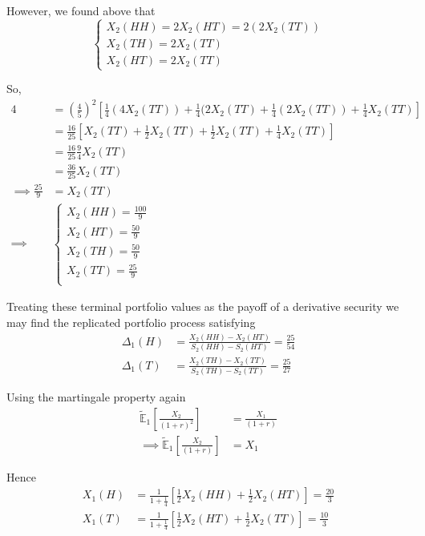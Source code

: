 \documentclass[12pt]{article}
\newlength\tindent
\renewcommand{\indent}{\hspace*{\tindent}}
\newcommand{\E}{\mathbb E}
\begin{document}
However, we found above that
\begin{equation*}
	\begin{cases}
		X_2(HH) = 2X_2(HT) = 2(2X_2(TT)) \\
		X_2(TH) = 2X_2(TT) \\
		X_2(HT) = 2X_2(TT)
	\end{cases}
\end{equation*}

So,
\begin{align*}
	4 &= \left( \frac{4}{5} \right)^2 \left[ \frac{1}{4}(4X_2(TT)) + \frac{1}{4}(2X_2(TT) + \frac{1}{4}(2X_2(TT)) + \frac{1}{4}X_2(TT) \right] \\
	&= \frac{16}{25} \left[ X_2(TT) + \frac{1}{2}X_2(TT) + \frac{1}{2}X_2(TT) + \frac{1}{4}X_2(TT) \right] \\
	&= \frac{16}{25}\frac{9}{4}X_2(TT) \\
	&= \frac{36}{25}X_2(TT) \\
	\implies \frac{25}{9} &= X_2(TT) \\
	\implies
	&\begin{cases}
		X_2(HH) = \frac{100}{9} \\
		X_2(HT) = \frac{50}{9} \\
		X_2(TH) = \frac{50}{9} \\
		X_2(TT) = \frac{25}{9} \\
	\end{cases}
\end{align*}

\indent Treating these terminal portfolio values as the payoff of a derivative security we may find the replicated portfolio process satisfying
\begin{align*}
	\Delta_1(H) &= \frac{ X_2(HH) - X_2(HT) }{ S_2(HH) - S_2(HT) } = \frac{25}{54} \\
	\Delta_1(T) &= \frac{ X_2(TH) - X_2(TT) }{ S_2(TH) - S_2(TT) } = \frac{25}{27} 
\end{align*}

Using the martingale property again 
\begin{align*}
	\tilde{\E}_1 \left[ \frac{X_2}{(1 + r)^2} \right] &= \frac{X_1}{(1 + r)} \\
	\implies \tilde{\E}_1 \left[ \frac{X_2}{(1 + r)} \right] &= X_1
\end{align*}

Hence
\begin{align*}
	X_1(H) &= \frac{1}{1 + \frac{1}{4}} \left[ \frac{1}{2}X_2(HH) + \frac{1}{2}X_2(HT) \right] = \frac{20}{3} \\
	X_1(T) &= \frac{1}{1 + \frac{1}{4}} \left[ \frac{1}{2}X_2(HT) + \frac{1}{2}X_2(TT) \right] = \frac{10}{3} \\
\end{align*}
\end{document}
